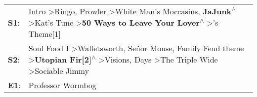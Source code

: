 \begin{supertabular}{p{0.03\textwidth}p{0.92\textwidth}}
 \textbf{S1}:  &                            Intro\textsuperscript{} \textgreater \enspace Ringo\textsuperscript{}, \enspace Prowler\textsuperscript{} \textgreater \enspace White Man's Moccasins\textsuperscript{}, \enspace \textbf{JaJunk\textsuperscript{$\wedge$}} \textgreater \enspace Kat's Tune\textsuperscript{} \textgreater \enspace \textbf{50 Ways to Leave Your Lover\textsuperscript{$\wedge$}} \textgreater {}'s Theme[1]\textsuperscript{}  \enspace  \\
 \textbf{S2}:  &  Soul Food I\textsuperscript{} \textgreater \enspace Walletsworth\textsuperscript{}, \enspace Señor Mouse\textsuperscript{}, \enspace Family Feud theme\textsuperscript{} \textgreater \enspace \textbf{Utopian Fir[2]\textsuperscript{$\wedge$}} \textgreater \enspace Visions\textsuperscript{},  Days\textsuperscript{} \textgreater \enspace The Triple Wide\textsuperscript{} \textgreater \enspace Sociable Jimmy\textsuperscript{}  \enspace  \\
 \textbf{E1}:  &                                                                                                                                                                                                                                                                                                                                                                                                                  Professor Wormbog\textsuperscript{}  \enspace  \\
\end{supertabular}
